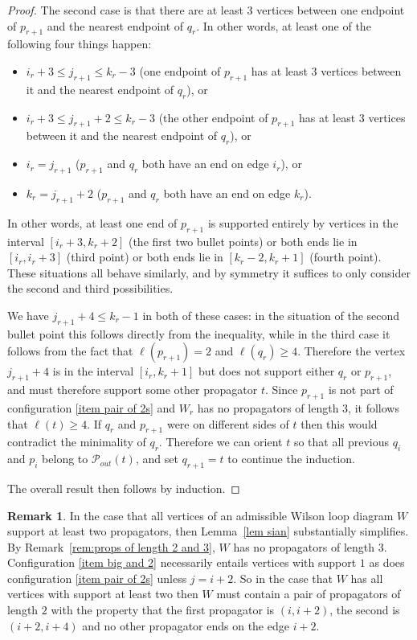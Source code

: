 \documentclass[11pt]{article}
\newcommand{\cP}{\mathcal{P}}
\theoremstyle{remark}
\theoremstyle{definition}
\newtheorem{rmk}[thm]{Remark}
\begin{document}
\begin{proof}
The second case is that there are at least $3$ vertices between one endpoint of $p_{r+1}$ and the nearest endpoint of $q_r$. In other words, at least one of the following four things happen:
\begin{itemize} 
\item $i_r+3 \leq j_{r+1}\leq k_r-3$ (one endpoint of $p_{r+1}$ has at least 3 vertices between it and the nearest endpoint of $q_r$), or
\item $i_r+3 \leq j_{r+1}+2\leq k_r-3$ (the other endpoint of $p_{r+1}$ has at least 3 vertices between it and the nearest endpoint of $q_r$), or
\item $i_r = j_{r+1}$ ($p_{r+1}$ and $q_r$ both have an end on edge $i_r$), or 
\item $k_r = j_{r+1} +2$  ($p_{r+1}$ and $q_r$ both have an end on edge $k_r$).
\end{itemize}
In other words, at least one end of $p_{r+1}$ is supported entirely by vertices in the interval $[i_r+3,k_r+2]$ (the first two bullet points) or both ends lie in $[i_r, i_r+3]$ (third point) or both ends lie in $[k_r-2, k_r+1]$ (fourth point). These situations all behave similarly, and by symmetry it suffices to only consider the second and third possibilities. 

We have $j_{r+1}+4 \leq k_r-1$ in both of these cases: in the situation of the second bullet point this follows directly from the inequality, while in the third case it follows from the fact that $\ell(p_{r+1}) = 2$ and $\ell(q_r) \geq 4$. Therefore the vertex $j_{r+1}+4$ is in the interval $[i_r, k_r+1]$ but does not support either $q_r$ or $p_{r+1}$, and must therefore support some other propagator $t$.  Since $p_{r+1}$ is not part of configuration \ref{item pair of 2s} and $W_r$ has no propagators of length 3, it follows that $\ell(t) \geq 4$.  If $q_r$ and $p_{r+1}$ were on different sides of $t$ then this would contradict the minimality of $q_r$.  Therefore we can orient $t$ so that all previous $q_i$ and $p_i$ belong to $\cP_{out}(t)$, and set $q_{r+1} = t$ to continue the induction.

The overall result then follows by induction.
\end{proof}


\begin{rmk}
In the case that all vertices of an admissible Wilson loop diagram $W$ support at least two propagators, then Lemma~\ref{lem sian} substantially simplifies.  By Remark~\ref{rem:props of length 2 and 3}, $W$ has no propagators of length $3$.  Configuration \ref{item big and 2} necessarily entails vertices with support $1$ as does configuration \ref{item pair of 2s} unless $j=i+2$.  So in the case that $W$ has all vertices with support at least two then $W$ must contain a pair of propagators of length $2$  with the property that the first propagator is $(i, i+2)$, the second is $(i+2, i+4)$ and no other propagator ends on the edge $i+2$.
\end{rmk}
\end{document}
